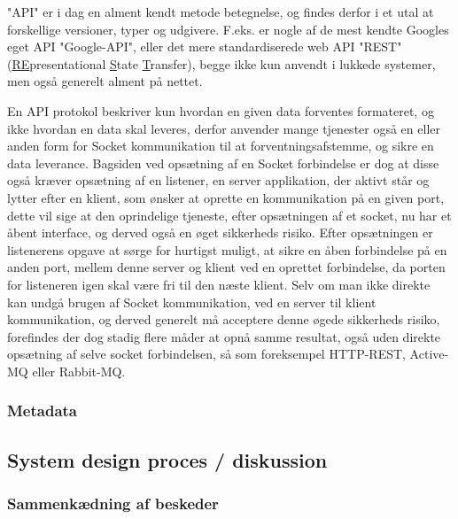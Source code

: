 "API" er i dag en alment kendt metode betegnelse, og findes derfor i et utal at forskellige versioner, typer og udgivere. F.eks. er nogle af de mest kendte Googles eget API "Google-API", eller det mere standardiserede web API "REST" (\underline{RE}presentational \underline{S}tate \underline{T}ransfer), begge ikke kun anvendt i lukkede systemer, men også generelt alment på nettet. \cite{codecademy_REST}

En API protokol beskriver kun hvordan en given data forventes formateret, og ikke hvordan en data skal leveres, derfor anvender mange tjenester også en eller anden form for Socket kommunikation til at forventningsafstemme, og sikre en data leverance. Bagsiden ved opsætning af en Socket forbindelse er dog at disse også kræver opsætning af en listener, en server applikation, der aktivt står og lytter efter en klient, som ønsker at oprette en kommunikation på en given port, dette vil sige at den oprindelige tjeneste, efter opsætningen af et socket, nu har et åbent interface, og derved også en øget sikkerheds risiko. Efter opsætningen er listenerens opgave at sørge for hurtigst muligt, at sikre en åben forbindelse på en anden port, mellem denne server og klient ved en oprettet forbindelse, da porten for listeneren igen skal være fri til den næste klient. \cite{WhatIsSocket} Selv om man ikke direkte kan undgå brugen af Socket kommunikation, ved en server til klient kommunikation, og derved generelt må acceptere denne øgede sikkerheds risiko, forefindes der dog stadig flere måder at opnå samme resultat, også uden direkte opsætning af selve socket forbindelsen, så som foreksempel HTTP-REST, Active-MQ eller Rabbit-MQ. \cite{SocketAlternatives}

\subsubsection{Metadata}
\label{Metadata}




\subsection{System design proces / diskussion}

\subsubsection{Sammenkædning af beskeder}

